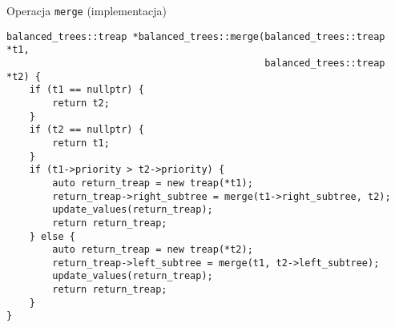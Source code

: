 \documentclass[polish]{beamer}
\begin{document}
\begin{frame}[fragile]{Operacja \texttt{merge} (implementacja)}
    \begin{lrbox}{\fifthbox}
        \begin{lstlisting}[linewidth=18cm]
balanced_trees::treap *balanced_trees::merge(balanced_trees::treap *t1,
                                             balanced_trees::treap *t2) {
    if (t1 == nullptr) {
        return t2;
    }
    if (t2 == nullptr) {
        return t1;
    }
    if (t1->priority > t2->priority) {
        auto return_treap = new treap(*t1);
        return_treap->right_subtree = merge(t1->right_subtree, t2);
        update_values(return_treap);
        return return_treap;
    } else {
        auto return_treap = new treap(*t2);
        return_treap->left_subtree = merge(t1, t2->left_subtree);
        update_values(return_treap);
        return return_treap;
    }
}
        \end{lstlisting}
    \end{lrbox}
    \begin{center}
        \scalebox{0.6}{\usebox{\fifthbox}}
    \end{center}
\end{frame}

\newsavebox{\eighthbox}
\end{document}
